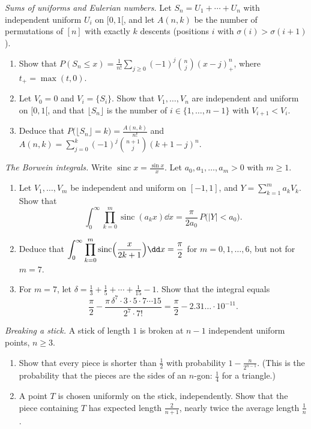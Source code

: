 \begin{exercise}[$\star\star\star$]\label{pb:irwinhall}
\emph{Sums of uniforms and Eulerian numbers.} Let $S_n=U_1+\cdots+U_n$ with independent uniform $U_i$ on $[0,1[$, and let $A(n,k)$
be the number of permutations of $[n]$ with exactly $k$ descents (positions $i$ with $\sigma(i)>\sigma(i+1)$).
\begin{enumerate}[label=(\alph*)]
\item Show that $\displaystyle P(S_n\le x)=\frac1{n!}\sum_{j\ge0}(-1)^j\binom nj(x-j)_+^n$, where $t_+=\max(t,0)$.
\item Let $V_0=0$ and $V_i=\{S_i\}$. Show that $V_1,\dots,V_n$ are independent and uniform on $[0,1[$, and that $\lfloor S_n\rfloor$ is the
number of $i\in\{1,\dots,n-1\}$ with $V_{i+1}<V_i$.
\item Deduce that $P\bigl(\lfloor S_n\rfloor=k\bigr)=\frac{A(n,k)}{n!}$ and $\displaystyle A(n,k)=\sum_{j=0}^k(-1)^j\binom{n+1}j(k+1-j)^n$.
\end{enumerate}
\end{exercise}

\begin{exercise}[$\star\star\star$]\label{pb:borwein}
\emph{The Borwein integrals.} Write $\operatorname{sinc}x=\frac{\sin x}x$. Let $a_0,a_1,\dots,a_m>0$ with $m\ge1$.
\begin{enumerate}[label=(\alph*)]
\item Let $V_1,\dots,V_m$ be independent and uniform on $[-1,1]$, and $Y=\sum_{k=1}^ma_kV_k$. Show that
\[
\int_0^\infty\prod_{k=0}^m\operatorname{sinc}(a_kx)\dd x=\frac\pi{2a_0}\,P\bigl(|Y|<a_0\bigr).
\]
\item Deduce that $\displaystyle\int_0^\infty\prod_{k=0}^m\operatorname{sinc}\Bigl(\frac x{2k+1}\Bigr)\dd x=\frac\pi2$ for $m=0,1,\dots,6$, but not for $m=7$.
\item For $m=7$, let $\delta=\frac13+\frac15+\cdots+\frac1{15}-1$. Show that the integral equals
\[
\frac\pi2-\frac{\pi\,\delta^7\cdot3\cdot5\cdot7\cdots15}{2^7\cdot7!}=\frac\pi2-2.31\ldots\cdot10^{-11}.
\]
\end{enumerate}
\end{exercise}

\begin{exercise}[$\star$]\label{pb:stick}
\emph{Breaking a stick.} A stick of length $1$ is broken at $n-1$ independent uniform points, $n\ge3$.
\begin{enumerate}[label=(\alph*)]
\item Show that every piece is shorter than $\frac12$ with probability $1-\frac n{2^{n-1}}$. (This is the probability that the pieces
are the sides of an $n$-gon: $\frac14$ for a triangle.)
\item A point $T$ is chosen uniformly on the stick, independently. Show that the piece containing $T$ has expected length $\frac2{n+1}$,
nearly twice the average length $\frac1n$.
\end{enumerate}
\end{exercise}

